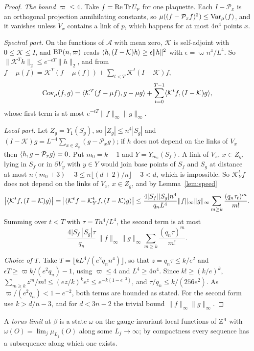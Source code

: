 \begin{proof}
\emph{The bound $\varpi\le4$.} Take $f=\operatorname{Re}\operatorname{Tr} U_p$ for one plaquette. Each
$I-\mathcal P_x$ is an orthogonal projection annihilating constants, so
$\mu((f-\mathcal P_xf)^2)\le\operatorname{Var}_\mu(f)$, and it vanishes unless $V_x$ contains
a link of $p$, which happens for at most $4n^4$ points $x$.

\emph{Spectral part.} On the functions of $\mathcal A$ with mean zero, $\mathcal K$
is self-adjoint with $0\le\mathcal K\le I$, and $\mathrm{BP}(n,\varpi)$ reads
$\langle h,(I-\mathcal K)h\rangle\ge\epsilon\|h\|^2$ with $\epsilon=\varpi n^4/L^4$. So
$\|\mathcal K^Th\|_2\le e^{-\epsilon T}\|h\|_2$, and from
$f-\mu(f)=\mathcal K^T(f-\mu(f))+\sum_{t<T}\mathcal K^t(I-\mathcal K)f$,
\[
\operatorname{Cov}_\mu(f,g)=\langle \mathcal K^T(f-\mu f),g-\mu g\rangle+\sum_{t=0}^{T-1}
\langle \mathcal K^tf,(I-\mathcal K)g\rangle,
\]
whose first term is at most $e^{-\epsilon T}\|f\|_\infty\|g\|_\infty$.

\emph{Local part.} Let $Z_g=Y_1(S_g)$, so $|Z_g|\le n^4|S_g|$ and $(I-\mathcal K)g=
L^{-4}\sum_{x\in Z_g}(g-\mathcal P_xg)$; if $h$ does not depend on the links of
$V_x$ then $\langle h,g-\mathcal P_xg\rangle=0$. Put $m_0=k-1$ and $Y=Y_{m_0}(S_f)$. A link
of $V_x$, $x\in Z_g$, lying in $S_f$ or in $\partial V_y$ with $y\in Y$ would join
base points of $S_f$ and $S_g$ at distance at most $n(m_0+3)-3\le n\lfloor
(d+2)/n\rfloor-3<d$, which is impossible. So $\mathcal K_Y^tf$ does not depend on
the links of $V_x$, $x\in Z_g$, and by Lemma~\ref{lem:speed}
\[
\bigl|\langle \mathcal K^tf,(I-\mathcal K)g\rangle\bigr|=\bigl|\langle \mathcal K^tf-\mathcal K_Y^tf,(I-\mathcal K)g\rangle\bigr|\le\frac{4|S_f||S_g|n^4}{q_nL^4}\|f\|_\infty\|g\|_\infty
\sum_{m\ge k}\frac{(q_n\tau_t)^m}{m!}.
\]
Summing over $t<T$ with $\tau=Tn^4/L^4$, the second term is at most
\[
\frac{4|S_f||S_g|\tau}{q_n}\,\|f\|_\infty\|g\|_\infty\sum_{m\ge k}
\frac{(q_n\tau)^m}{m!}.
\]

\emph{Choice of $T$.} Take $T=\lfloor kL^4/(e^2q_nn^4)\rfloor$, so that $z=q_n
\tau\le k/e^2$ and $\epsilon T\ge\varpi k/(e^2q_n)-1$, using $\varpi\le4$ and
$L^4\ge4n^4$. Since $k!\ge(k/e)^k$, $\sum_{m\ge k}z^m/m!\le(ez/k)^ke^z\le
e^{-k(1-e^{-2})}$, and $\tau/q_n\le k/(256e^2)$. As $\varpi/(e^2q_n)<1-e^{-2}$,
both terms are bounded as stated. For the second form use $k>d/n-3$, and for
$d<3n-2$ the trivial bound $\|f\|_\infty\|g\|_\infty$.
\end{proof}

A \emph{torus limit} at $\beta$ is a state $\omega$ on the gauge-invariant local
functions of $\mathbb{Z}^4$ with $\omega(O)=\lim_j\mu_{L_j}(O)$ along some $L_j\to\infty$;
by compactness every sequence has a subsequence along which one exists.

